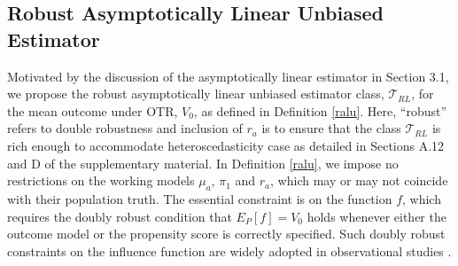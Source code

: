 \documentclass[11pt]{article}
\theoremstyle{referenceplain}
\theoremstyle{referencedefinition}
\theoremstyle{referenceremark}
\begin{document}
\subsection{Robust Asymptotically Linear Unbiased Estimator}
Motivated by the discussion of the asymptotically linear estimator in Section 3.1, we propose the robust asymptotically linear unbiased estimator class, $\mathcal{T}_{RL}$, for the mean outcome under OTR, $V_0$, as defined in Definition \ref{ralu}. Here, ``robust'' refers to double robustness and inclusion of $r_a$ is to ensure that the class $\mathcal{T}_{RL}$ is rich enough to accommodate heteroscedasticity case as detailed in  Sections A.12 and D of the supplementary material. In Definition \ref{ralu}, we impose no restrictions on the working models $\mu_a$, $\pi_1$ and $r_a$, which may or may not coincide with their population truth. The essential constraint is on the function $f$, which requires the doubly robust condition that $E_P[f]=V_0$ holds whenever either the outcome model or the propensity score is correctly specified. Such doubly robust constraints on the influence function are widely adopted in observational studies \citep{ding2023first}.
\end{document}
